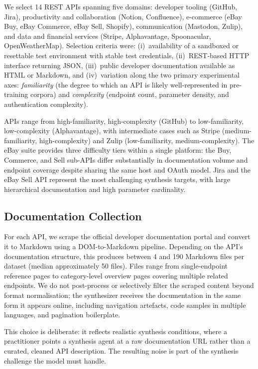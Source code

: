 We select 14 REST APIs spanning five domains: developer tooling (GitHub, Jira), productivity and collaboration (Notion, Confluence), e-commerce (eBay Buy, eBay Commerce, eBay Sell, Shopify), communication (Mastodon, Zulip), and data and financial services (Stripe, Alphavantage, Spoonacular, OpenWeatherMap). Selection criteria were: (i)~availability of a sandboxed or resettable test environment with stable test credentials, (ii)~REST-based HTTP interface returning JSON, (iii)~public developer documentation available as HTML or Markdown, and (iv)~variation along the two primary experimental axes: \emph{familiarity} (the degree to which an API is likely well-represented in pre-training corpora) and \emph{complexity} (endpoint count, parameter density, and authentication complexity).

APIs range from high-familiarity, high-complexity (GitHub) to low-familiarity, low-complexity (Alphavantage), with intermediate cases such as Stripe (medium-familiarity, high-complexity) and Zulip (low-familiarity, medium-complexity). The eBay suite provides three difficulty tiers within a single platform: the Buy, Commerce, and Sell sub-APIs differ substantially in documentation volume and endpoint coverage despite sharing the same host and OAuth model. Jira and the eBay Sell API represent the most challenging synthesis targets, with large hierarchical documentation and high parameter cardinality.

\subsection{Documentation Collection}

For each API, we scrape the official developer documentation portal and convert it to Markdown using a DOM-to-Markdown pipeline. Depending on the API's documentation structure, this produces between 4 and 190 Markdown files per dataset (median approximately 50 files). Files range from single-endpoint reference pages to category-level overview pages covering multiple related endpoints. We do not post-process or selectively filter the scraped content beyond format normalisation; the synthesizer receives the documentation in the same form it appears online, including navigation artefacts, code samples in multiple languages, and pagination boilerplate.

This choice is deliberate: it reflects realistic synthesis conditions, where a practitioner points a synthesis agent at a raw documentation URL rather than a curated, cleaned API description. The resulting noise is part of the synthesis challenge the model must handle.

